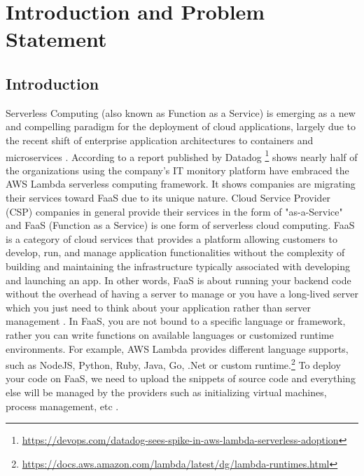 %
\section{Introduction and Problem Statement}
\label{sec:introduction-and-problem-statement}
\subsection{Introduction}
Serverless Computing (also known as Function as a Service) is emerging as a new and compelling paradigm for the deployment of cloud applications, largely due to the recent shift of enterprise application architectures to containers and microservices \cite{inproceedings}.
According to a report published by Datadog \footnote{\url{https://devops.com/datadog-sees-spike-in-aws-lambda-serverless-adoption}} shows nearly half of the organizations using the company's IT monitory platform have embraced the AWS Lambda serverless computing framework. It shows companies are migrating their services toward FaaS due to its unique nature. Cloud Service Provider (CSP) companies in general provide their services in the form of "as-a-Service" and FaaS (Function as a Service) is one form of serverless cloud computing.
FaaS is a category of cloud services that provides a platform allowing customers to develop, run, and manage application functionalities without the complexity of building and maintaining the infrastructure typically associated with developing and launching an app.\cite{Anu:2018} In other words, FaaS is about running your backend code without the overhead of having a server to manage or you have a long-lived server which you just need to think about your application rather than server management \cite{Anu:2018}. In FaaS, you are not bound to a specific language or framework, rather you can write functions on available languages or customized runtime environments. For example, AWS Lambda provides different language supports, such as NodeJS, Python, Ruby, Java, Go, .Net or custom runtime.\footnote{\url{https://docs.aws.amazon.com/lambda/latest/dg/lambda-runtimes.html}} To deploy your code on FaaS, we need to upload the snippets of source code and everything else will be managed by the providers such as initializing virtual machines, process management, etc \cite{Anu:2018}.
